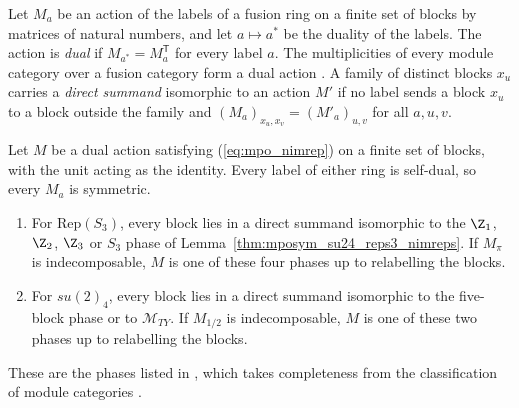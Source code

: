 \begin{definition}%
    \label{def:mposym_dual_nimrep}
    \leanok
    Let $M_a$ be an action of the labels of a fusion ring on a finite set of
    blocks by matrices of natural numbers, and let $a\mapsto a^*$ be the
    duality of the labels. The action is \emph{dual} if
    $M_{a^*}=M_a^{\mathsf T}$ for every label $a$. The multiplicities of
    every module category over a fusion category form a dual action
    \cite{gap:glm23_reps3_su24_module_list}. A family of distinct blocks
    $x_u$ carries a \emph{direct summand} isomorphic to an action $M'$ if
    no label sends a block $x_u$ to a block outside the family and
    $(M_a)_{x_u,x_v}=(M'_a)_{u,v}$ for all $a,u,v$.
\end{definition}

\begin{lemma}%
    \label{lem:mposym_su24_reps3_dual_classification}
    \leanok
    Let $M$ be a dual action satisfying (\ref{eq:mpo_nimrep}) on a finite
    set of blocks, with the unit acting as the identity. Every label of
    either ring is self-dual, so every $M_a$ is symmetric.
    \begin{enumerate}
        \item For $\mathrm{Rep}(S_3)$, every block lies in a direct summand
              isomorphic to the $\Z_1$, $\Z_2$, $\Z_3$ or $S_3$ phase of
              Lemma~\ref{thm:mposym_su24_reps3_nimreps}. If $M_\pi$ is
              indecomposable, $M$ is one of these four phases up to
              relabelling the blocks.
        \item For $su(2)_4$, every block lies in a direct summand
              isomorphic to the five-block phase or to $\mathcal M_{TY}$. If
              $M_{1/2}$ is indecomposable, $M$ is one of these two phases up
              to relabelling the blocks.
    \end{enumerate}
    These are the phases listed in \cite[Section~6]{GarreRubio2023MPOSym},
    which takes completeness from the classification of module categories
    \cite{gap:glm23_reps3_su24_module_list}.
\end{lemma}

